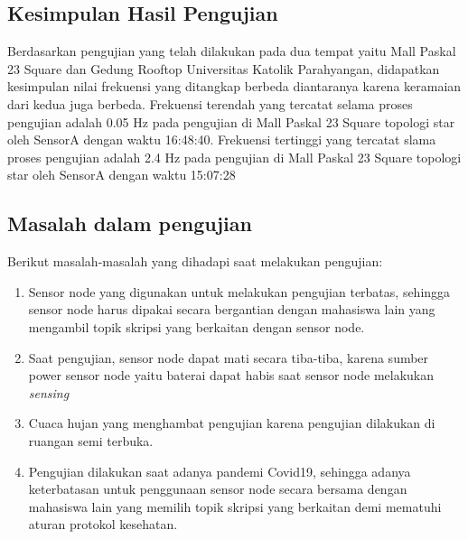 \pagebreak
\subsection{Kesimpulan Hasil Pengujian}
Berdasarkan pengujian yang telah dilakukan pada dua tempat yaitu Mall Paskal 23 Square dan Gedung Rooftop Universitas Katolik Parahyangan, didapatkan kesimpulan nilai frekuensi yang ditangkap berbeda diantaranya karena keramaian dari kedua juga berbeda. Frekuensi terendah yang tercatat selama proses pengujian adalah 0.05 Hz pada pengujian di Mall Paskal 23 Square topologi star oleh SensorA dengan waktu 16:48:40. Frekuensi tertinggi yang tercatat slama proses pengujian adalah 2.4 Hz pada pengujian di Mall Paskal 23 Square topologi star oleh SensorA dengan waktu 15:07:28 

\subsection{Masalah dalam pengujian}
Berikut masalah-masalah yang dihadapi saat melakukan pengujian:

\begin{enumerate}
    \item Sensor node yang digunakan untuk melakukan pengujian terbatas, sehingga sensor node harus dipakai secara bergantian dengan mahasiswa lain yang mengambil topik skripsi yang berkaitan dengan sensor node.
    
    \item Saat pengujian, sensor node dapat mati secara tiba-tiba, karena sumber power sensor node yaitu baterai dapat habis saat sensor node melakukan \textit{sensing}
    
    \item Cuaca hujan yang menghambat pengujian karena pengujian dilakukan di ruangan semi terbuka.
    
    \item Pengujian dilakukan saat adanya pandemi Covid19, sehingga adanya keterbatasan untuk penggunaan sensor node secara bersama dengan mahasiswa lain yang memilih topik skripsi yang berkaitan demi mematuhi aturan protokol kesehatan.
\end{enumerate}